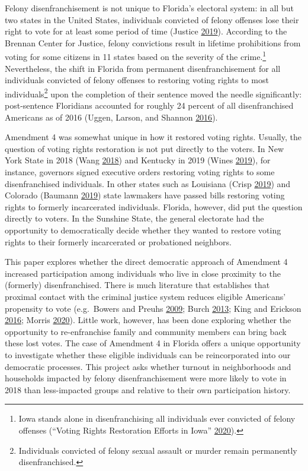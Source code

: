 \documentclass[
  12pt,
]{article}
\begin{document}
Felony disenfranchisement is not unique to Florida's electoral system: in all but two states in the United States, individuals convicted of felony offenses lose their right to vote for at least some period of time (Justice \protect\hyperlink{ref-bcj_laws}{2019}). According to the Brennan Center for Justice, felony convictions result in lifetime prohibitions from voting for some citizens in 11 states based on the severity of the crime.\footnote{Iowa stands alone in disenfranchising all individuals ever convicted of felony offenses (``Voting Rights Restoration Efforts in Iowa'' \protect\hyperlink{ref-bcj_iowa}{2020}).} Nevertheless, the shift in Florida from permanent disenfranchisement for all individuals convicted of felony offenses to restoring voting rights to most individuals\footnote{Individuals convicted of felony sexual assault or murder remain permanently disenfranchised.} upon the completion of their sentence moved the needle significantly: post-sentence Floridians accounted for roughly 24 percent of all disenfranchised Americans as of 2016 (Uggen, Larson, and Shannon \protect\hyperlink{ref-sentencing_2016}{2016}).

Amendment 4 was somewhat unique in how it restored voting rights. Usually, the question of voting rights restoration is not put directly to the voters. In New York State in 2018 (Wang \protect\hyperlink{ref-Wang2018}{2018}) and Kentucky in 2019 (Wines \protect\hyperlink{ref-Wines2019}{2019}), for instance, governors signed executive orders restoring voting rights to some disenfranchised individuals. In other states such as Louisiana (Crisp \protect\hyperlink{ref-Crisp2019}{2019}) and Colorado (Baumann \protect\hyperlink{ref-Baumann2019}{2019}) state lawmakers have passed bills restoring voting rights to formerly incarcerated individuals. Florida, however, did put the question directly to voters. In the Sunshine State, the general electorate had the opportunity to democratically decide whether they wanted to restore voting rights to their formerly incarcerated or probationed neighbors.

This paper explores whether the direct democratic approach of Amendment 4 increased participation among individuals who live in close proximity to the (formerly) disenfranchised. There is much literature that establishes that proximal contact with the criminal justice system reduces eligible Americans' propensity to vote (e.g.~Bowers and Preuhs \protect\hyperlink{ref-Bowers2009}{2009}; Burch \protect\hyperlink{ref-Burch2013}{2013}; King and Erickson \protect\hyperlink{ref-King2016}{2016}; Morris \protect\hyperlink{ref-Morris2020}{2020}). Little work, however, has been done exploring whether the opportunity to re-enfranchise family and community members can bring back these lost votes. The case of Amendment 4 in Florida offers a unique opportunity to investigate whether these eligible individuals can be reincorporated into our democratic processes. This project asks whether turnout in neighborhoods and households impacted by felony disenfranchisement were more likely to vote in 2018 than less-impacted groups and relative to their own participation history.
\end{document}
